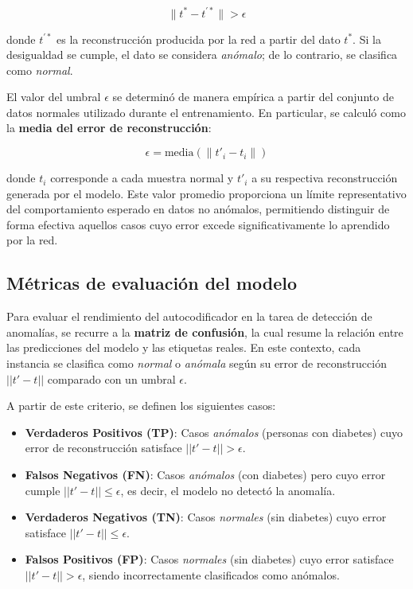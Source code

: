 \documentclass[a4paper,10pt]{book}
\begin{document}
\begin{equation}
	\lVert t^{*} - t^{\prime *} \rVert > \epsilon
	\label{eq:dif_reconstruccion}
\end{equation}

donde $t^{\prime *}$ es la reconstrucción producida por la red a partir del dato $t^{*}$. Si la desigualdad se cumple, el dato se considera \emph{anómalo}; de lo contrario, se clasifica como \emph{normal}.

El valor del umbral $\epsilon$ se determinó de manera empírica a partir del conjunto de datos normales utilizado durante el entrenamiento. En particular, se calculó como la \textbf{media del error de reconstrucción}:

\begin{equation}
	\epsilon = \text{media}\!\left( \lVert t'_i - t_i \rVert \right)
	\label{eq:epsilon}
\end{equation}

donde $t_i$ corresponde a cada muestra normal y $t'_i$ a su respectiva reconstrucción generada por el modelo. Este valor promedio proporciona un límite representativo del comportamiento esperado en datos no anómalos, permitiendo distinguir de forma efectiva aquellos casos cuyo error excede significativamente lo aprendido por la red.

\subsection{Métricas de evaluación del modelo}

Para evaluar el rendimiento del autocodificador en la tarea de detección de anomalías, se recurre a la \textbf{matriz de confusión}, la cual resume la relación entre las predicciones del modelo y las etiquetas reales. En este contexto, cada instancia se clasifica como \emph{normal} o \emph{anómala} según su error de reconstrucción $||t' - t||$ comparado con un umbral $\epsilon$.

A partir de este criterio, se definen los siguientes casos:

\begin{itemize}
	\item \textbf{Verdaderos Positivos (TP)}: Casos \emph{anómalos} (personas con diabetes) cuyo error de reconstrucción satisface $||t' - t|| > \epsilon$.
	
	\item \textbf{Falsos Negativos (FN)}: Casos \emph{anómalos} (con diabetes) pero cuyo error cumple $||t' - t|| \le \epsilon$, es decir, el modelo no detectó la anomalía.
	
	\item \textbf{Verdaderos Negativos (TN)}: Casos \emph{normales} (sin diabetes) cuyo error satisface $||t' - t|| \le \epsilon$.
	
	\item \textbf{Falsos Positivos (FP)}: Casos \emph{normales} (sin diabetes) cuyo error satisface $||t' - t|| > \epsilon$, siendo incorrectamente clasificados como anómalos.
\end{itemize}
\end{document}
